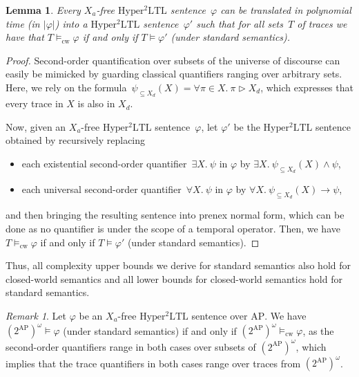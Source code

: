 \documentclass[dvipsnames,10pt,a4paper]{amsart}
\newtheorem{lem}[thm]{Lemma}
\theoremstyle{definition}
\theoremstyle{remark}
\newtheorem{rem}[thm]{Remark}
\renewcommand{\phi}{\varphi}
\newcommand{\size}[1]{|#1|}
\newcommand{\pow}[1]{2^{#1}}
\newcommand{\sohyltl}{\mathrm{Hyper^2LTL}\xspace}
\newcommand{\ap}[0]{\mathrm{AP}}
\newcommand{\univar}{X_a}
\newcommand{\unidisvar}{X_d}
\newcommand{\tracein}{\mathrel{\triangleright}}
\newcommand{\cw}{\mathrm{cw}}
\begin{document}
\begin{lem}
\label{lem_cwtoclassical}
Every $\univar$-free $\sohyltl$ sentence~$\phi$ can be translated in polynomial time (in $\size{\varphi}$) into a $\sohyltl$ sentence~$\phi'$ such that for all sets~$T$ of traces we have that $T \models_\cw \phi$  if and only if  $T \models \phi'$ (under standard semantics).
\end{lem}

\begin{proof}
Second-order quantification over subsets of the universe of discourse can easily be mimicked by guarding classical quantifiers ranging over arbitrary sets.
Here, we rely on the formula~$\psi_{\subseteq \unidisvar}(X) = \forall \pi \in X.\ \pi \tracein \unidisvar$, which expresses that every trace in $X$ is also in $\unidisvar$.

Now, given an $\univar$-free $\sohyltl$ sentence~$\phi$, let $\phi'$ be the $\sohyltl$ sentence obtained by recursively replacing
\begin{itemize}
    \item each existential second-order quantifier~$\exists X.\ \psi$ in $\phi$ by 
    $\exists X.\ \psi_{\subseteq \unidisvar}(X) \wedge \psi $, 
    
    \item each universal second-order quantifier~$\forall X.\ \psi$ in $\phi$ by 
    $\forall X.\ \psi_{\subseteq \unidisvar}(X)\rightarrow \psi$,
\end{itemize}
and then bringing the resulting sentence into prenex normal form, which can be done as no quantifier is under the scope of a temporal operator.
Then, we have $T \models_\cw \phi$  if and only if  $T \models \phi'$ (under standard semantics).
\end{proof}


Thus, all complexity upper bounds we derive for standard semantics also hold for closed-world semantics and all lower bounds for closed-world semantics hold for standard semantics.

\begin{rem}
\label{rem_cwvsclassicalforfullsetoftraces}
Let $\phi$ be an $\univar$-free $\sohyltl$ sentence over $\ap$.
We have $(\pow{\ap})^\omega \models \varphi$ (under standard semantics) if and only if $(\pow{\ap})^\omega \models_\cw \varphi$, as the second-order quantifiers range in both cases over subsets of $(\pow{\ap})^\omega$, which implies that the trace quantifiers in both cases range over traces from $(\pow{\ap})^\omega$.
\end{rem}
\end{document}
